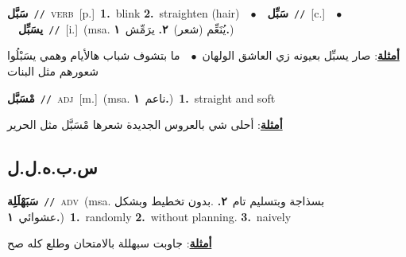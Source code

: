 \documentclass[10pt,a4paper,twoside]{article} %
\begin{document}
\begin{multicols}{2}
{\setlength\topsep{0pt}\textbf{\foreignlanguage{arabic}{سَبَّل}}\ {\color{gray}\texttt{//}\color{black}}\ \textsc{verb}\ [p.]\ \textbf{1.}~blink  \textbf{2.}~straighten (hair)\ \ $\bullet$\ \ \setlength\topsep{0pt}\textbf{\foreignlanguage{arabic}{سَبِّل}}\ {\color{gray}\texttt{//}\color{black}}\ [c.]\ \ $\bullet$\ \ \setlength\topsep{0pt}\textbf{\foreignlanguage{arabic}{يسَبِّل}}\ {\color{gray}\texttt{//}\color{black}}\ [i.]\ \color{gray}(msa. \foreignlanguage{arabic}{يُنَعِّم (شعر)}~\foreignlanguage{arabic}{\textbf{٢.}}  \foreignlanguage{arabic}{يرَمِّش}~\foreignlanguage{arabic}{\textbf{١.}})\color{black}\  \begin{flushright}\color{gray}\foreignlanguage{arabic}{\textbf{\underline{\foreignlanguage{arabic}{أمثلة}}}: صار يسبِّل بعيونه زي العاشق الولهان\ $\bullet$\ \  ما بتشوف شباب هالأيام وهمي يسَبْلُوا شعورهم مثل البنات}\end{flushright}\color{black}} \vspace{2mm}

{\setlength\topsep{0pt}\textbf{\foreignlanguage{arabic}{مْسَبَّل}}\ {\color{gray}\texttt{//}\color{black}}\ \textsc{adj}\ [m.]\ \color{gray}(msa. \foreignlanguage{arabic}{ناعم}~\foreignlanguage{arabic}{\textbf{١.}})\color{black}\ \textbf{1.}~straight and soft\  \begin{flushright}\color{gray}\foreignlanguage{arabic}{\textbf{\underline{\foreignlanguage{arabic}{أمثلة}}}: أحلى شي بالعروس الجديدة شعرها مْسَبَّل مثل الحرير}\end{flushright}\color{black}} \vspace{2mm}

\vspace{-3mm}
\subsection*{\color{blue}\foreignlanguage{arabic}{س.ب.ه.ل.ل}\color{blue}{ (ntws)}} 

{\setlength\topsep{0pt}\textbf{\foreignlanguage{arabic}{سَبَهْلَلِة}}\ {\color{gray}\texttt{//}\color{black}}\ \textsc{adv}\ \color{gray}(msa. \foreignlanguage{arabic}{بسذاجة وبتسليم تام}~\foreignlanguage{arabic}{\textbf{٢.}}  .\foreignlanguage{arabic}{بدون تخطيط وبشكل عشوائي}~\foreignlanguage{arabic}{\textbf{١.}})\color{black}\ \textbf{1.}~randomly  \textbf{2.}~without planning.  \textbf{3.}~naively\  \begin{flushright}\color{gray}\foreignlanguage{arabic}{\textbf{\underline{\foreignlanguage{arabic}{أمثلة}}}: جاوبت سبهللة بالامتحان وطلع كله صح}\end{flushright}\color{black}} \vspace{2mm}


\end{multicols}
\end{document}
